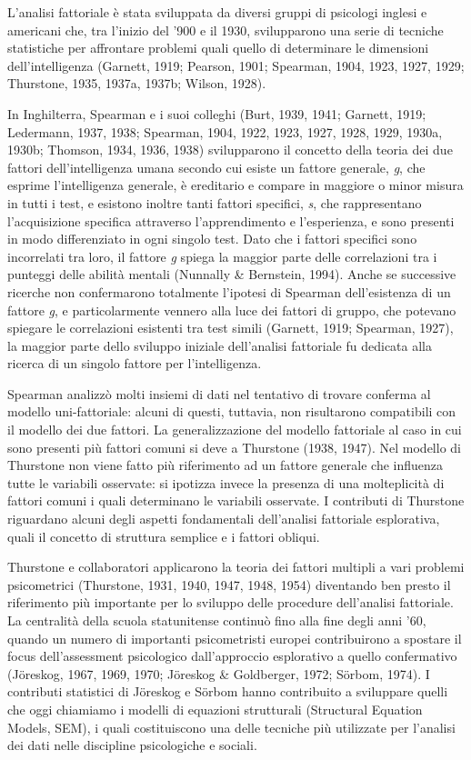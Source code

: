 \documentclass[
  11pt,
]{krantz}
\theoremstyle{definition}
\theoremstyle{definition}
\theoremstyle{definition}
\theoremstyle{definition}
\theoremstyle{remark}
\begin{document}
L'analisi fattoriale è stata sviluppata da diversi gruppi di psicologi inglesi e americani che, tra l'inizio del '900 e il 1930, svilupparono una serie di tecniche statistiche per affrontare problemi quali quello di determinare le dimensioni dell'intelligenza (Garnett, 1919; Pearson, 1901; Spearman, 1904, 1923, 1927, 1929; Thurstone, 1935, 1937a, 1937b; Wilson, 1928).

In Inghilterra, Spearman e i suoi colleghi (Burt, 1939, 1941; Garnett, 1919; Ledermann, 1937, 1938; Spearman, 1904, 1922, 1923, 1927, 1928, 1929, 1930a, 1930b; Thomson, 1934, 1936, 1938) svilupparono il concetto della teoria dei due fattori dell'intelligenza umana secondo cui esiste un fattore generale, \emph{g}, che esprime l'intelligenza generale, è ereditario e compare in maggiore o minor misura in tutti i test, e esistono inoltre tanti fattori specifici, \emph{s}, che rappresentano l'acquisizione specifica attraverso l'apprendimento e l'esperienza, e sono presenti in modo differenziato in ogni singolo test. Dato che i fattori specifici sono incorrelati tra loro, il fattore \emph{g} spiega la maggior parte delle correlazioni tra i punteggi delle abilità mentali (Nunnally \& Bernstein, 1994). Anche se successive ricerche non confermarono totalmente l'ipotesi di Spearman dell'esistenza di un fattore \emph{g}, e particolarmente vennero alla luce dei fattori di gruppo, che potevano spiegare le correlazioni esistenti tra test simili (Garnett, 1919; Spearman, 1927), la maggior parte dello sviluppo iniziale dell'analisi fattoriale fu dedicata alla ricerca di un singolo fattore per l'intelligenza.

Spearman analizzò molti insiemi di dati nel tentativo di trovare conferma al modello uni-fattoriale: alcuni di questi, tuttavia, non risultarono compatibili con il modello dei due fattori. La generalizzazione del modello fattoriale al caso in cui sono presenti più fattori comuni si deve a Thurstone (1938, 1947). Nel modello di Thurstone non viene fatto più riferimento ad un fattore generale che influenza tutte le variabili osservate: si ipotizza invece la presenza di una molteplicità di fattori comuni i quali determinano le variabili osservate. I contributi di Thurstone riguardano alcuni degli aspetti fondamentali dell'analisi fattoriale esplorativa, quali il concetto di struttura semplice e i fattori obliqui.

Thurstone e collaboratori applicarono la teoria dei fattori multipli a vari problemi psicometrici (Thurstone, 1931, 1940, 1947, 1948, 1954) diventando ben presto il riferimento più importante per lo sviluppo delle procedure dell'analisi fattoriale. La centralità della scuola statunitense continuò fino alla fine degli anni '60, quando un numero di importanti psicometristi europei contribuirono a spostare il focus dell'assessment psicologico dall'approccio esplorativo a quello confermativo (Jöreskog, 1967, 1969, 1970; Jöreskog \& Goldberger, 1972; Sörbom, 1974). I contributi statistici di Jöreskog e Sörbom hanno contribuito a sviluppare quelli che oggi chiamiamo i modelli di equazioni strutturali (Structural Equation Models, SEM), i quali costituiscono una delle tecniche più utilizzate per l'analisi dei dati nelle discipline psicologiche e sociali.
\end{document}
